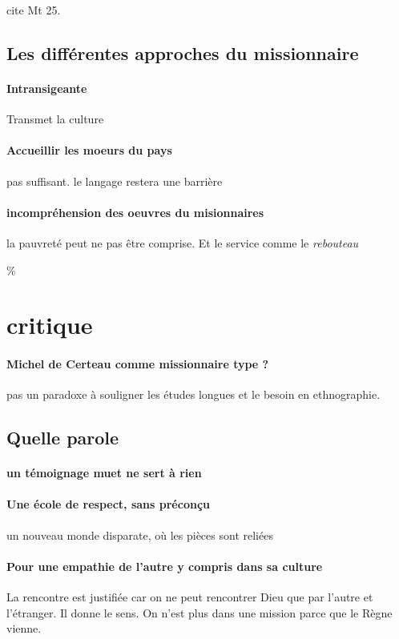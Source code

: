 cite Mt 25. 
\subsection{Les différentes approches du missionnaire}

\paragraph{Intransigeante} Transmet la culture

\paragraph{Accueillir les moeurs du pays} pas suffisant. le langage restera une barrière



\paragraph{incompréhension des oeuvres du misionnaires} la pauvreté peut ne pas être comprise. Et le service comme le \textit{rebouteau}


\%%
\section{critique}

\paragraph{Michel de Certeau comme missionnaire type ?} pas un paradoxe à souligner les études longues et le besoin en ethnographie. 

\subsection{Quelle parole}

\paragraph{un témoignage muet ne sert à rien}
\paragraph{Une école de respect, sans préconçu} un nouveau monde disparate, où les pièces sont reliées 

\paragraph{Pour une empathie de l'autre y compris dans sa culture} La rencontre est justifiée car on ne peut rencontrer Dieu que par l'autre et l'étranger.  Il donne le sens. On n'est plus dans une mission parce que le Règne vienne. 



